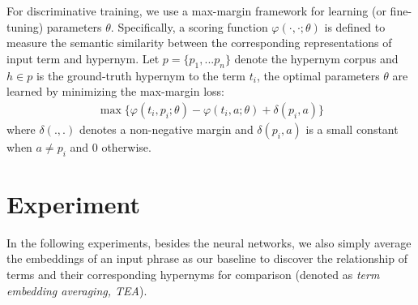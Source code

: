 \documentclass[11pt,a4paper]{article}
\begin{document}
For discriminative training, we use a max-margin framework for learning (or fine-tuning) parameters $\theta$. Specifically, a scoring function $\varphi(\cdot,\cdot;\theta)$ is defined to measure the semantic similarity between the corresponding representations of input term and hypernym. Let $p=\{p_1,...p_n\}$ denote the hypernym corpus and $h \in p$ is the ground-truth hypernym to the term $t_{i}$, the optimal parameters $\theta$ are learned by minimizing the max-margin loss:  
\begin{align*}
\max \{\varphi(t_{i},p_{i};\theta)-\varphi(t_{i},a;\theta)+\delta(p_{i},a)\}
\end{align*}
where $\delta(.,.)$ denotes a non-negative margin and $\delta(p_{i},a)$ is a small constant when $a\neq p_{i}$ and 0 otherwise. 

\section{Experiment}
In the following experiments, besides the neural networks, we also simply average the embeddings of an input phrase as our baseline to discover the relationship of terms and their corresponding hypernyms for comparison (denoted as \emph{term embedding averaging, TEA}).
\end{document}
